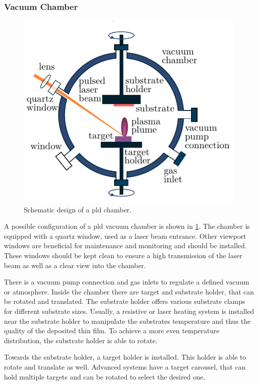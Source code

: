 \subsubsection{Vacuum Chamber}
\begin{figure}[h!]
	\centering
	\includegraphics{../assets/pld_chamber}
	\caption{Schematic design of a \ac{pld} chamber.}
	\label{fig:pld_chamber}
\end{figure}
A possible configuration of a \ac{pld} vacuum chamber is shown in 
\cref{fig:pld_chamber}.
The chamber is equipped with a quartz window, used as a laser beam entrance.
Other viewport windows are beneficial for maintenance and monitoring and should
be installed.
These windows should be kept clean to ensure a high transmission of the laser beam
as well as a clear view into the chamber.

There is a vacuum pump connection and gas inlets to regulate a defined
vacuum or atmosphere.
Inside the chamber there are target and substrate holder, that can be rotated and
translated. 
The substrate holder offers various substrate clamps for different substrate sizes.
Usually, a resistive or laser heating system is installed near the substrate holder to
manipulate the substrates temperature and thus the quality of the deposited thin film.
To achieve a more even temperature distribution, the substrate holder is able to rotate.

Towards the substrate holder, a target holder is installed.
This holder is able to rotate and translate as well.
Advanced systems have a target carousel, that can hold multiple targets and can be
rotated to select the desired one.

